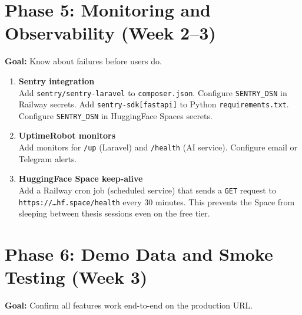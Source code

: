 \documentclass[12pt,a4paper]{report}
\begin{document}
\section{Phase 5: Monitoring and Observability (Week 2--3)}

\textbf{Goal:} Know about failures before users do.

\begin{enumerate}[leftmargin=1.5em, label=\textbf{\arabic*.}, start=20]

    \item \textbf{Sentry integration} \\
    Add \texttt{sentry/sentry-laravel} to \texttt{composer.json}.
    Configure \texttt{SENTRY\_DSN} in Railway secrets.
    Add \texttt{sentry-sdk[fastapi]} to Python \texttt{requirements.txt}.
    Configure \texttt{SENTRY\_DSN} in HuggingFace Spaces secrets.

    \item \textbf{UptimeRobot monitors} \\
    Add monitors for \texttt{/up} (Laravel) and \texttt{/health}
    (AI service). Configure email or Telegram alerts.

    \item \textbf{HuggingFace Space keep-alive} \\
    Add a Railway cron job (scheduled service) that sends a
    \texttt{GET} request to
    \texttt{https://\ldots{}hf.space/health} every 30 minutes.
    This prevents the Space from sleeping between thesis sessions
    even on the free tier.

\end{enumerate}

\section{Phase 6: Demo Data and Smoke Testing (Week 3)}

\textbf{Goal:} Confirm all features work end-to-end on the production URL.
\end{document}
